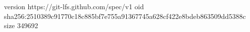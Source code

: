 version https://git-lfs.github.com/spec/v1
oid sha256:2510389c91770c18c885bf7e755a91367745a628cf422e8bdeb863509dd5388c
size 349692
